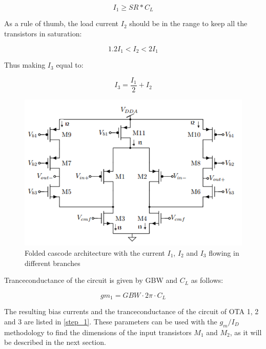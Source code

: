 \begin{equation}\label{I_1}
    I_1 \geq SR*C_L
\end{equation}

As a rule of thumb, the load current $I_2$ should be in the range to keep all the transistors in saturation\cite{Razavi}:

\begin{equation}\label{I_2}
    1.2I_1<I_2<2I_1
\end{equation}

Thus making $I_3$ equal to:

\begin{equation}\label{I_3}
    I_3 = \frac{I_1}{2} + I_2
\end{equation}

\begin{figure}[h]
\centering
\includegraphics[scale = 0.8]{images/folded_cascode.png}
\caption{Folded cascode architecture with the current $I_1$, $I_2$ and $I_3$ flowing in different branches \cite{Grey}}
\label{fig:folded_ota_design}
\end{figure}

Tranceconductance of the circuit is given by GBW and $C_L$ as follows:

\begin{equation}
    gm_1 = GBW\cdot2\pi\cdot C_L
\end{equation}

The resulting bias currents and the tranceconductance of the circuit of OTA 1, 2 and 3 are listed in \ref{step_1}. These parameters can be used with the $g_m/I_D$ methodology to find the dimensions of the input transistors $M_1$ and $M_2$, as it will be described in the next section. 

